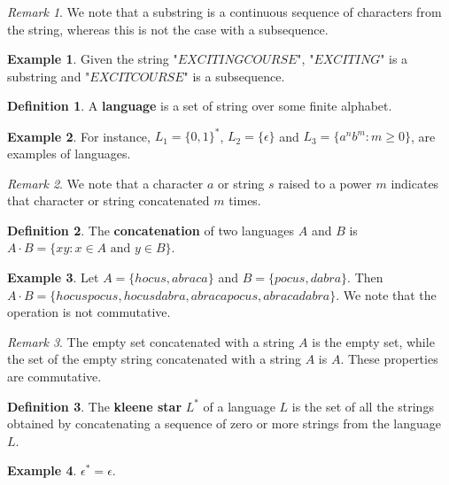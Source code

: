 \documentclass[11pt]{article}
\theoremstyle{plain} %
\theoremstyle{definition}
\newtheorem*{definition}{Definition} %
\theoremstyle{example}
\newtheorem*{example}{Example}
\theoremstyle{remark}
\newtheorem*{remark}{Remark}
\begin{document}
\begin{remark}
We note that a substring is a continuous sequence of characters from the string, whereas this is not the case with a subsequence. 
\end{remark}

\begin{example}
Given the string "$EXCITING COURSE$", "$EXCITING$" is a substring and "$EXCITCOURSE$" is a subsequence. 
\end{example}

\begin{definition}
A \textbf{language} is a set of string over some finite alphabet. 
\end{definition}

\begin{example}
For instance, $L_1 = \{0,1\}^*$, $L_2 = \{\epsilon\}$ and $L_3 = \{a^nb^m : m \geq 0\}$, are examples of languages. 
\end{example}

\begin{remark}
We note that a character $a$ or string $s$ raised to a power $m$ indicates that character or string concatenated $m$ times. 
\end{remark}

\begin{definition}
The \textbf{concatenation} of two languages $A$ and $B$ is $A \cdot B = \{xy : x \in A\text{ and } y \in B\}$. 
\end{definition}

\begin{example}
Let $A = \{hocus, abraca\}$ and $B = \{pocus, dabra\}$. Then $A\cdot B = \{hocuspocus, hocusdabra, abracapocus, abracadabra\}$. We note that the operation is not commutative. 
\end{example}

\begin{remark}
The empty set concatenated with a string $A$ is the empty set, while the set of the empty string concatenated with a string $A$ is $A$. These properties are commutative.
\end{remark}

\begin{definition}
The \textbf{kleene star} $L^*$ of a language $L$ is the set of all the strings obtained by concatenating a sequence of zero or more strings from the language $L$. 
\end{definition}

\begin{example}
${\epsilon}^* = {\epsilon}$. 
\end{example}
\end{document}
